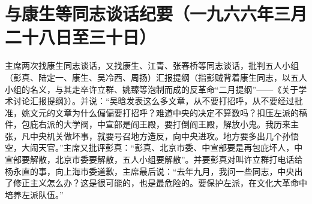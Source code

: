 \section[与康生等同志谈话纪要（一九六六年三月二十八日至三十日）]{与康生等同志谈话纪要（一九六六年三月二十八日至三十日）}


主席两次找康生同志谈话，又找康生、江青、张春桥等同志谈话，批判五人小组（彭真、陆定一、康生、吴冷西、周扬）汇报提纲（指彭贼背着康生同志，以五人小组的名义，与其走卒许立群、姚臻等泡制而成的反革命“二月提纲”——《关于学术讨论汇报提纲》）。并说：“吴晗发表这么多文章，从不要打招呼，从不要经过批准，姚文元的文章为什么偏偏要打招呼？难道中央的决定不算数吗？扣压左派的稿件，包庇右派的大学阀，中宣部是阎王殿，要打倒阎王殿，解放小鬼。我历来主张，凡中央机关做坏事，就要号召地方造反，向中央进攻。地方要多出几个孙悟空，大闹天官。”主席又批评彭真：“彭真、北京市委、中宣部要是再包庇坏人，中宣部要解散，北京市委要解散，五人小组要解散”。并要彭真对叫许立群打电话给杨永直的事，向上海市委道歉，主席最后说：“去年九月，我问一些同志，中央出了修正主义怎么办？这是很可能的，也是最危险的。要保护左派，在文化大革命中培养左派队伍。”

